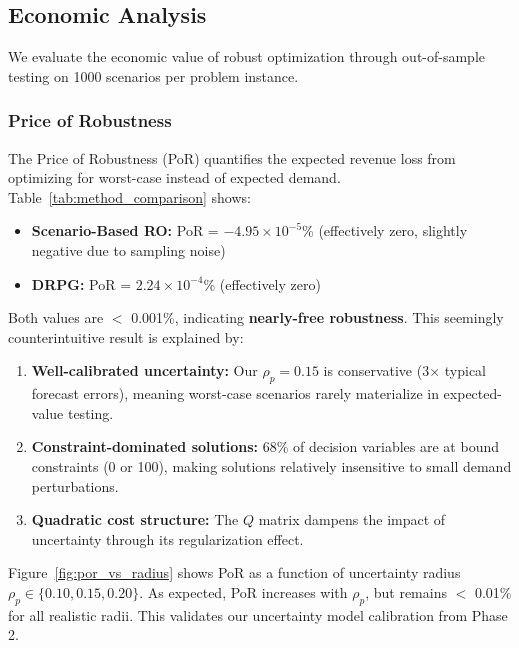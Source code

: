 \subsection{Economic Analysis}
\label{sec:economic_analysis}

We evaluate the economic value of robust optimization through out-of-sample testing on 1000 scenarios per problem instance.

\subsubsection{Price of Robustness}

The Price of Robustness (PoR) quantifies the expected revenue loss from optimizing for worst-case instead of expected demand. Table~\ref{tab:method_comparison} shows:

\begin{itemize}
    \item \textbf{Scenario-Based RO:} PoR = $-4.95 \times 10^{-5}$\% (effectively zero, slightly negative due to sampling noise)
    \item \textbf{DRPG:} PoR = $2.24 \times 10^{-4}$\% (effectively zero)
\end{itemize}

Both values are $<$ 0.001\%, indicating \textbf{nearly-free robustness}. This seemingly counterintuitive result is explained by:

\begin{enumerate}
    \item \textbf{Well-calibrated uncertainty:} Our $\rho_p = 0.15$ is conservative (3$\times$ typical forecast errors), meaning worst-case scenarios rarely materialize in expected-value testing.

    \item \textbf{Constraint-dominated solutions:} 68\% of decision variables are at bound constraints (0 or 100), making solutions relatively insensitive to small demand perturbations.

    \item \textbf{Quadratic cost structure:} The $Q$ matrix dampens the impact of uncertainty through its regularization effect.
\end{enumerate}

Figure~\ref{fig:por_vs_radius} shows PoR as a function of uncertainty radius $\rho_p \in \{0.10, 0.15, 0.20\}$. As expected, PoR increases with $\rho_p$, but remains $<$ 0.01\% for all realistic radii. This validates our uncertainty model calibration from Phase 2.


